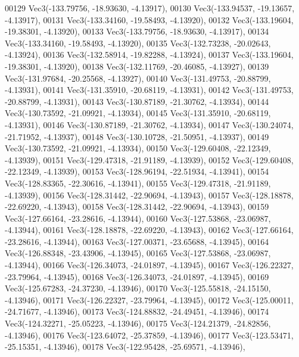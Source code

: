 \begin{DoxyCode}
00129         Vec3(-133.79756, -18.93630, -4.13917),
00130         Vec3(-133.94537, -19.13657, -4.13917),
00131         Vec3(-133.34160, -19.58493, -4.13920),
00132         Vec3(-133.19604, -19.38301, -4.13920),
00133         Vec3(-133.79756, -18.93630, -4.13917),
00134         Vec3(-133.34160, -19.58493, -4.13920),
00135         Vec3(-132.73238, -20.02643, -4.13924),
00136         Vec3(-132.58914, -19.82288, -4.13924),
00137         Vec3(-133.19604, -19.38301, -4.13920),
00138         Vec3(-132.11769, -20.46085, -4.13927),
00139         Vec3(-131.97684, -20.25568, -4.13927),
00140         Vec3(-131.49753, -20.88799, -4.13931),
00141         Vec3(-131.35910, -20.68119, -4.13931),
00142         Vec3(-131.49753, -20.88799, -4.13931),
00143         Vec3(-130.87189, -21.30762, -4.13934),
00144         Vec3(-130.73592, -21.09921, -4.13934),
00145         Vec3(-131.35910, -20.68119, -4.13931),
00146         Vec3(-130.87189, -21.30762, -4.13934),
00147         Vec3(-130.24074, -21.71952, -4.13937),
00148         Vec3(-130.10728, -21.50951, -4.13937),
00149         Vec3(-130.73592, -21.09921, -4.13934),
00150         Vec3(-129.60408, -22.12349, -4.13939),
00151         Vec3(-129.47318, -21.91189, -4.13939),
00152         Vec3(-129.60408, -22.12349, -4.13939),
00153         Vec3(-128.96194, -22.51934, -4.13941),
00154         Vec3(-128.83365, -22.30616, -4.13941),
00155         Vec3(-129.47318, -21.91189, -4.13939),
00156         Vec3(-128.31442, -22.90694, -4.13943),
00157         Vec3(-128.18878, -22.69220, -4.13943),
00158         Vec3(-128.31442, -22.90694, -4.13943),
00159         Vec3(-127.66164, -23.28616, -4.13944),
00160         Vec3(-127.53868, -23.06987, -4.13944),
00161         Vec3(-128.18878, -22.69220, -4.13943),
00162         Vec3(-127.66164, -23.28616, -4.13944),
00163         Vec3(-127.00371, -23.65688, -4.13945),
00164         Vec3(-126.88348, -23.43906, -4.13945),
00165         Vec3(-127.53868, -23.06987, -4.13944),
00166         Vec3(-126.34073, -24.01897, -4.13945),
00167         Vec3(-126.22327, -23.79964, -4.13945),
00168         Vec3(-126.34073, -24.01897, -4.13945),
00169         Vec3(-125.67283, -24.37230, -4.13946),
00170         Vec3(-125.55818, -24.15150, -4.13946),
00171         Vec3(-126.22327, -23.79964, -4.13945),
00172         Vec3(-125.00011, -24.71677, -4.13946),
00173         Vec3(-124.88832, -24.49451, -4.13946),
00174         Vec3(-124.32271, -25.05223, -4.13946),
00175         Vec3(-124.21379, -24.82856, -4.13946),
00176         Vec3(-123.64072, -25.37859, -4.13946),
00177         Vec3(-123.53471, -25.15351, -4.13946),
00178         Vec3(-122.95428, -25.69571, -4.13946),

\end{DoxyCode}

